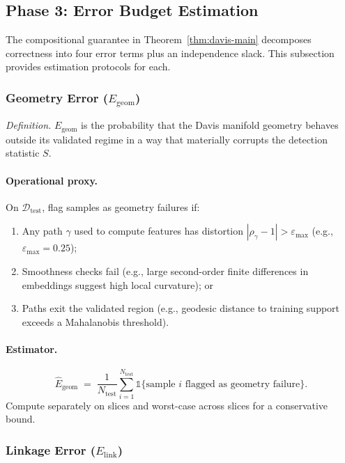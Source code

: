 \documentclass[11pt]{article}
\begin{document}
\subsection{Phase 3: Error Budget Estimation}
\label{subsec:error-budget-estimation}

The compositional guarantee in Theorem~\ref{thm:davis-main} decomposes correctness into four error terms plus an independence slack. This subsection provides estimation protocols for each.

\subsubsection{Geometry Error ($E_{\mathrm{geom}}$)}
\label{subsubsec:egeom}

\emph{Definition.} $E_{\mathrm{geom}}$ is the probability that the Davis manifold geometry behaves outside its validated regime in a way that materially corrupts the detection statistic $S$.

\paragraph{Operational proxy.}
On $\mathcal{D}_{\mathrm{test}}$, flag samples as geometry failures if:
\begin{enumerate}[label=(\alph*),leftmargin=*]
  \item Any path $\gamma$ used to compute features has distortion $|\rho_\gamma - 1| > \varepsilon_{\text{max}}$ (e.g., $\varepsilon_{\text{max}} = 0.25$);
  \item Smoothness checks fail (e.g., large second-order finite differences in embeddings suggest high local curvature); or
  \item Paths exit the validated region (e.g., geodesic distance to training support exceeds a Mahalanobis threshold).
\end{enumerate}

\paragraph{Estimator.}
\[
\hat E_{\mathrm{geom}}
\;=\;
\frac{1}{N_{\mathrm{test}}} \sum_{i=1}^{N_{\mathrm{test}}} \mathbb{1}\{\text{sample } i \text{ flagged as geometry failure}\}.
\]
Compute separately on slices and worst-case across slices for a conservative bound.

\subsubsection{Linkage Error ($E_{\mathrm{link}}$)}
\label{subsubsec:elink}
\end{document}
